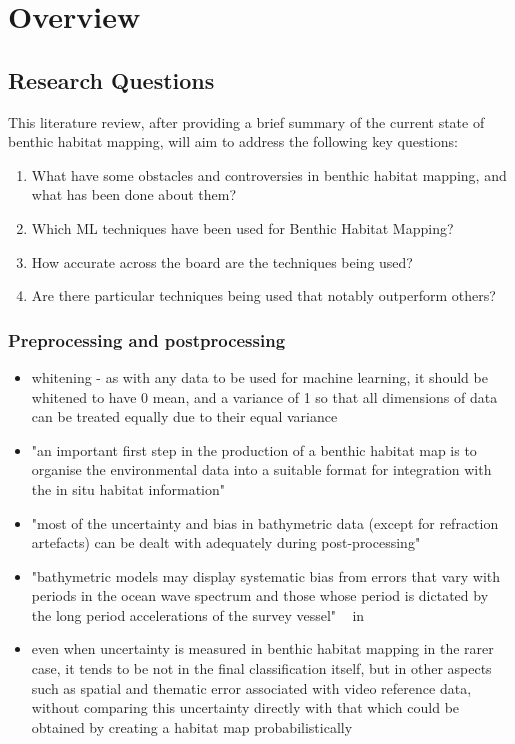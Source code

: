  \section{Overview}
 
 \subsection{Research Questions}
 This literature review, after providing a brief summary of the current state of benthic habitat mapping, will aim to address the following key questions:\\
 \begin{enumerate}
     \item What have some obstacles and controversies in benthic habitat mapping, and what has been done about them?
     \item Which ML techniques have been used for Benthic Habitat Mapping?
     \item How accurate across the board are the techniques being used?
     \item Are there particular techniques being used that notably outperform others?
 \end{enumerate}
 
 \subsubsection{Preprocessing and postprocessing}
 \begin{itemize} 
     \item whitening - as with any data to be used for machine learning, it should be whitened to have 0 mean, and a variance of 1 so that all dimensions of data can be treated equally due to their equal variance 
     \item "an important first step in the production of a benthic habitat map is to organise the environmental data into a suitable format for integration with the in situ habitat information" ~\citep*{cjbrown11}
     \item "most of the uncertainty and bias in bathymetric data (except for refraction artefacts) can be dealt with adequately during post-processing" ~\citep*{kostylev12}
     \item "bathymetric models may display systematic bias from errors that vary with periods in the ocean wave spectrum and those whose period is dictated by the long period accelerations of the survey vessel" ~\citep*{hughes03} in ~\citep*{kostylev12}
     \item even when uncertainty is measured in benthic habitat mapping in the rarer case, it tends to be not in the final classification itself, but in other aspects such as spatial and thematic error associated with video reference data, without comparing this uncertainty directly with that which could be obtained by creating a habitat map probabilistically ~\citep*{rattray14}
 \end{itemize}
 
